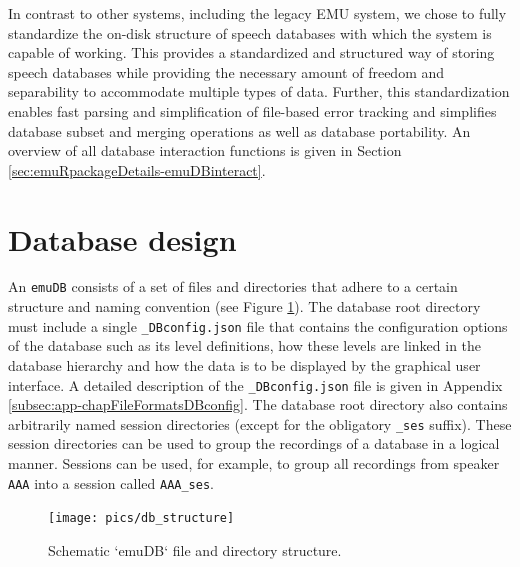 \documentclass[]{book}
\begin{document}
In contrast to other systems, including the legacy EMU system, we chose to fully standardize the on-disk structure of speech databases with which the system is capable of working. This provides a standardized and structured way of storing speech databases while providing the necessary amount of freedom and separability to accommodate multiple types of data. Further, this standardization enables fast parsing and simplification of file-based error tracking and simplifies database subset and merging operations as well as database portability. An overview of all database interaction functions is given in Section \ref{sec:emuRpackageDetails-emuDBinteract}.

\hypertarget{database-design}{%
\section{Database design}\label{database-design}}

An \texttt{emuDB} consists of a set of files and directories that adhere to a certain structure and naming convention (see Figure \ref{fig:schematic-emuDB-structure}). The database root directory must include a single \texttt{\_DBconfig.json} file that contains the configuration options of the database such as its level definitions, how these levels are linked in the database hierarchy and how the data is to be displayed by the graphical user interface. A detailed description of the \texttt{\_DBconfig.json} file is given in Appendix \ref{subsec:app-chapFileFormatsDBconfig}. The database root directory also contains arbitrarily named session directories (except for the obligatory \texttt{\_ses} suffix). These session directories can be used to group the recordings of a database in a logical manner. Sessions can be used, for example, to group all recordings from speaker \texttt{AAA} into a session called \texttt{AAA\_ses}.

\begin{figure}

{\centering \texttt{[image: pics/db\_structure]} 

}

\caption{Schematic `emuDB` file and directory structure.}\label{fig:schematic-emuDB-structure}
\end{figure}
\end{document}
